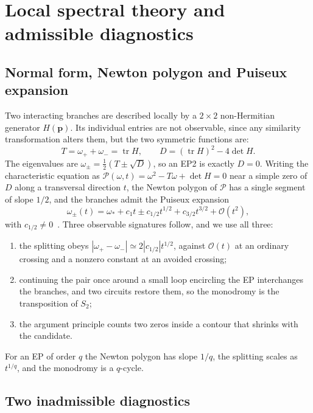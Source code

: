 \documentclass[aps,prd,reprint,superscriptaddress,nofootinbib,longbibliography]{revtex4-2}
\theoremstyle{plain}
\theoremstyle{definition}
\theoremstyle{remark}
\newcommand{\Ord}{\mathcal{O}}
\begin{document}
\section{Local spectral theory and admissible diagnostics}\label{sec:local}

\subsection{Normal form, Newton polygon and Puiseux expansion}
\label{sec:local:puiseux}

Two interacting branches are described locally by a $2\times2$ non-Hermitian
generator $H(\bm p)$. Its individual entries are not observable, since any
similarity transformation alters them, but the two symmetric functions are:
\begin{equation}\label{eq:TD}
  T=\omega_++\omega_-=\operatorname{tr}H,\qquad
  D=(\operatorname{tr}H)^2-4\det H .
\end{equation}
The eigenvalues are $\omega_\pm=\tfrac12(T\pm\sqrt D)$, so an EP2 is exactly
$D=0$. Writing the characteristic equation as
$\mathcal{P}(\omega,t)=\omega^2-T\omega+\det H=0$ near a simple zero of $D$ along
a transversal direction $t$, the Newton polygon of $\mathcal{P}$ has a single
segment of slope $1/2$, and the branches admit the Puiseux expansion
\begin{equation}\label{eq:puiseux}
  \omega_\pm(t)=\omega_*+c_1t\pm c_{1/2}t^{1/2}+c_{3/2}t^{3/2}+\Ord(t^2),
\end{equation}
with $c_{1/2}\ne0$~\cite{KatoE71,Nennig2019E67}. Three observable signatures
follow, and we use all three:
\begin{enumerate}
\item the splitting obeys $|\omega_+-\omega_-|\simeq2|c_{1/2}|t^{1/2}$, against
$\Ord(t)$ at an ordinary crossing and a nonzero constant at an avoided crossing;
\item continuing the pair once around a small loop encircling the EP interchanges
the branches, and two circuits restore them, so the monodromy is the
transposition of $S_2$;
\item the argument principle counts two zeros inside a contour that shrinks with
the candidate.
\end{enumerate}
For an EP of order $q$ the Newton polygon has slope $1/q$, the splitting scales
as $t^{1/q}$, and the monodromy is a $q$-cycle.

\subsection{Two inadmissible diagnostics}\label{sec:local:inadmissible}
\end{document}
